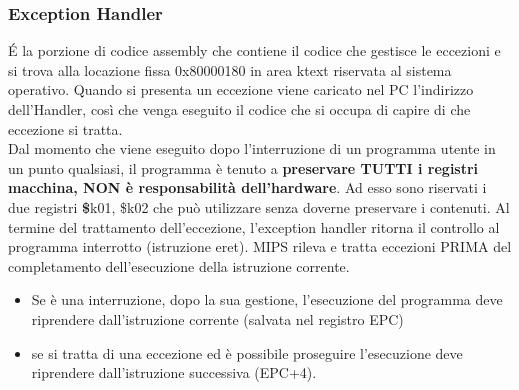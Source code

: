 \documentclass[12pt, a4paper, openany]{book}
\begin{document}
\subsubsection*{Exception Handler}
\'E la porzione di codice assembly che contiene il codice che gestisce le eccezioni
e si trova alla locazione fissa 0x80000180 in area ktext riservata al sistema operativo.
Quando si presenta un eccezione viene caricato nel PC l'indirizzo dell'Handler, così che
venga eseguito il codice che si occupa di capire di che eccezione si tratta.
\\ Dal momento che viene eseguito dopo l'interruzione di un programma utente in un punto
qualsiasi, il programma è tenuto a \textbf{preservare TUTTI i registri macchina, NON è responsabilità dell'hardware}.
Ad esso sono riservati i due registri \textbf \$k01, \$k02 che può utilizzare senza doverne preservare i contenuti.
Al termine del trattamento dell'eccezione, l'exception handler ritorna il controllo al programma
interrotto (istruzione eret).
MIPS rileva e tratta eccezioni PRIMA del completamento dell'esecuzione della istruzione corrente.
\begin{itemize}
    \item Se è una interruzione, dopo la sua gestione, l'esecuzione del programma deve
    riprendere dall'istruzione corrente (salvata nel registro EPC)
    \item se si tratta di una eccezione ed è possibile proseguire l'esecuzione deve riprendere
    dall'istruzione successiva (EPC+4).
\end{itemize}
\end{document}
